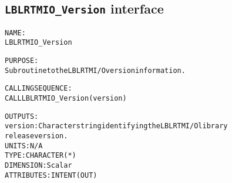 \subsection{\texttt{LBLRTMIO\_Version} interface}
  \label{sec:LBLRTMIO_Version_interface}
  \begin{alltt}
 
  NAME:
        LBLRTMIO_Version
 
  PURPOSE:
        Subroutine to the LBLRTM I/O version information.
 
  CALLING SEQUENCE:
        CALL LBLRTMIO_Version( version )
 
  OUTPUTS:
        version:       Character string identifying the LBLRTM I/O library
                       release version.
                       UNITS:      N/A
                       TYPE:       CHARACTER(*)
                       DIMENSION:  Scalar
                       ATTRIBUTES: INTENT(OUT)
 
  \end{alltt}
